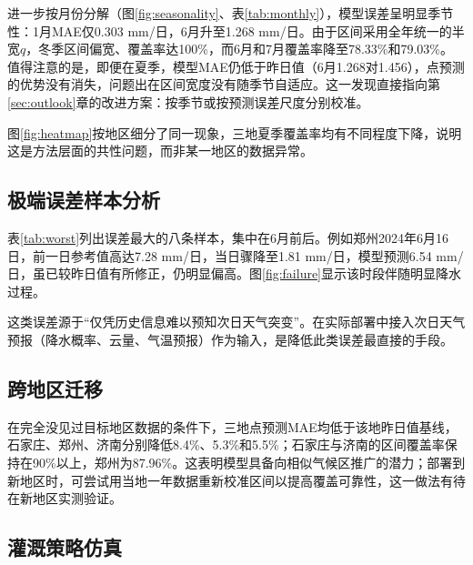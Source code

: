 进一步按月份分解（图\ref{fig:seasonality}、表\ref{tab:monthly}），模型误差呈明显季节性：1月MAE仅0.303 mm/日，6月升至1.268 mm/日。由于区间采用全年统一的半宽$q$，冬季区间偏宽、覆盖率达100\%，而6月和7月覆盖率降至78.33\%和79.03\%。值得注意的是，即便在夏季，模型MAE仍低于昨日值（6月1.268对1.456），点预测的优势没有消失，问题出在区间宽度没有随季节自适应。这一发现直接指向第\ref{sec:outlook}章的改进方案：按季节或按预测误差尺度分别校准。


图\ref{fig:heatmap}按地区细分了同一现象，三地夏季覆盖率均有不同程度下降，说明这是方法层面的共性问题，而非某一地区的数据异常。

\subsection{极端误差样本分析}

表\ref{tab:worst}列出误差最大的八条样本，集中在6月前后。例如郑州2024年6月16日，前一日参考值高达7.28 mm/日，当日骤降至1.81 mm/日，模型预测6.54 mm/日，虽已较昨日值有所修正，仍明显偏高。图\ref{fig:failure}显示该时段伴随明显降水过程。


这类误差源于“仅凭历史信息难以预知次日天气突变”。在实际部署中接入次日天气预报（降水概率、云量、气温预报）作为输入，是降低此类误差最直接的手段。

\subsection{跨地区迁移}

在完全没见过目标地区数据的条件下，三地点预测MAE均低于该地昨日值基线，石家庄、郑州、济南分别降低8.4\%、5.3\%和5.5\%；石家庄与济南的区间覆盖率保持在90\%以上，郑州为87.96\%。这表明模型具备向相似气候区推广的潜力；部署到新地区时，可尝试用当地一年数据重新校准区间以提高覆盖可靠性，这一做法有待在新地区实测验证。

\subsection{灌溉策略仿真}

